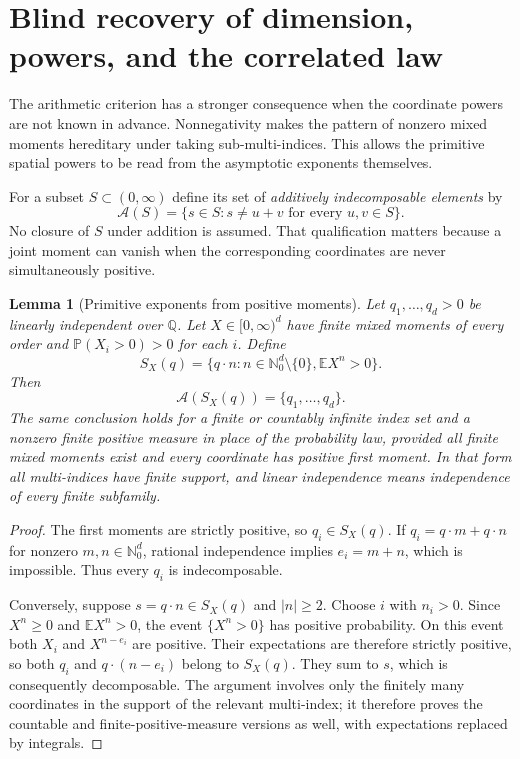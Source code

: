 \documentclass[11pt,letterpaper]{article}
\newtheorem{lemma}[theorem]{Lemma}
\theoremstyle{definition}
\theoremstyle{remark}
\newcommand{\E}{\mathbb E}
\newcommand{\Pp}{\mathbb P}
\newcommand{\1}{\mathbf 1}
\begin{document}
\section{Blind recovery of dimension, powers, and the correlated law}
\label{p07:sec:blind-gate-arithmetic}

The arithmetic criterion has a stronger consequence when the coordinate
powers are not known in advance. Nonnegativity makes the pattern of
nonzero mixed moments hereditary under taking sub-multi-indices. This
allows the primitive spatial powers to be read from the asymptotic
exponents themselves.

For a subset $S\subset(0,\infty)$ define its set of \emph{additively
indecomposable elements} by
\begin{equation}\label{p07:eq:blind-indecomposables}
 \mathcal A(S)=\{s\in S:s\ne u+v\text{ for every }u,v\in S\}.
\end{equation}
No closure of $S$ under addition is assumed. That qualification matters
because a joint moment can vanish when the corresponding coordinates are
never simultaneously positive.

\begin{lemma}[Primitive exponents from positive moments]
\label{p07:lem:blind-primitive-exponents}
Let $q_1,\ldots,q_d>0$ be linearly independent over $\mathbb Q$.
Let $X\in[0,\infty)^d$ have finite mixed moments of every order and
$\Pp(X_i>0)>0$ for each $i$. Define
\begin{equation}\label{p07:eq:blind-support}
 S_X(q)=\{q\cdot n:n\in\mathbb N_0^d\setminus\{0\},
                           \E X^n>0\}.
\end{equation}
Then
\begin{equation}\label{p07:eq:blind-atoms}
 \mathcal A(S_X(q))=\{q_1,\ldots,q_d\}.
\end{equation}
The same conclusion holds for a finite or countably infinite index set
and a nonzero finite positive measure in place of the probability law,
provided all finite mixed moments exist and every coordinate has positive
first moment. In that form all multi-indices have finite support, and
linear independence means independence of every finite subfamily.
\end{lemma}
\begin{proof}
The first moments are strictly positive, so $q_i\in S_X(q)$.
If $q_i=q\cdot m+q\cdot n$ for nonzero $m,n\in\mathbb N_0^d$,
rational independence implies $e_i=m+n$, which is impossible.
Thus every $q_i$ is indecomposable.

Conversely, suppose $s=q\cdot n\in S_X(q)$ and $|n|\geq2$.
Choose $i$ with $n_i>0$. Since $X^n\geq0$ and $\E X^n>0$,
the event $\{X^n>0\}$ has positive probability. On this event both
$X_i$ and $X^{n-e_i}$ are positive. Their expectations are therefore
strictly positive, so both $q_i$ and $q\cdot(n-e_i)$ belong to
$S_X(q)$. They sum to $s$, which is consequently decomposable. The argument involves only the
finitely many coordinates in the support of the relevant multi-index;
it therefore proves the countable and finite-positive-measure versions
as well, with expectations replaced by integrals.
\end{proof}
\end{document}
